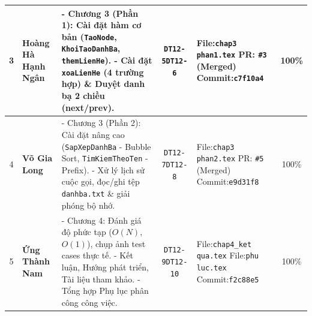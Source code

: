 \documentclass[12pt,a4paper]{report}
\begin{document}
\begin{table}[htbp]
\begin{tabularx}{\textwidth}{|c|>{\raggedright\arraybackslash}p{2.0cm}|X|c|>{\raggedright\arraybackslash}p{2.7cm}|c|}
3 & \textbf{Hoàng Hà Hạnh Ngân}
  & - Chương 3 (Phần 1): Cài đặt hàm cơ bản (\texttt{TaoNode}, \texttt{KhoiTaoDanhBa}, \texttt{themLienHe}).\newline
    - Cài đặt \texttt{xoaLienHe} (4 trường hợp) \& Duyệt danh bạ 2 chiều (next/prev).
  & \texttt{DT12-5}\newline \texttt{DT12-6}
  & File:\texttt{\small chap3}\newline
  \texttt{\small phan1.tex}\newline
    PR: \texttt{\small \#3} (Merged)\newline
    Commit:\newline \texttt{\small c7f10a4}
  & 100\% \\ \hline

4 & \textbf{Võ Gia Long}
  & - Chương 3 (Phần 2): Cài đặt nâng cao (\texttt{SapXepDanhBa} - Bubble Sort, \texttt{TimKiemTheoTen} - Prefix).\newline
    - Xử lý lịch sử cuộc gọi, đọc/ghi tệp \texttt{danhba.txt} \& giải phóng bộ nhớ.
  & \texttt{DT12-7}\newline \texttt{DT12-8}
  & File:\texttt{\small  chap3}\newline
  \texttt{\small  phan2.tex}\newline
    PR: \texttt{\small \#5} (Merged)\newline
    Commit:\newline \texttt{\small e9d31f8}
  & 100\% \\ \hline

5 & \textbf{Ứng Thành Nam}
  & - Chương 4: Đánh giá độ phức tạp ($O(N)$, $O(1)$), chụp ảnh test cases thực tế.\newline
    - Kết luận, Hướng phát triển, Tài liệu tham khảo.\newline
    - Tổng hợp Phụ lục phân công công việc.
  & \texttt{DT12-9}\newline \texttt{DT12-10}
  & File:\texttt{\small chap4\_ket}\newline
  \texttt{\small qua.tex}\newline
    File:\texttt{\small phu luc.tex}\newline
    Commit:\newline \texttt{\small f2c88e5}
  & 100\% \\ \hline

\end{tabularx}
\end{table}
\end{document}
